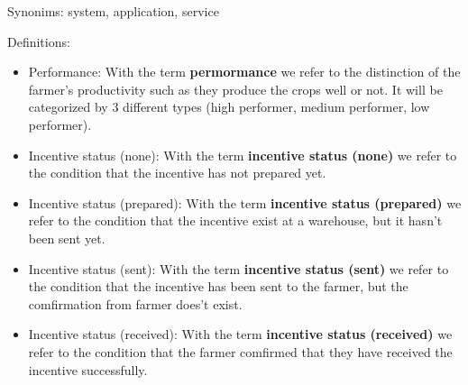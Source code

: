 Synonims: system, application, service

Definitions:
\begin{itemize}
    \item Performance: With the term \textbf{permormance} we refer to the distinction of the farmer's productivity such as they produce the crops well or not. It will be categorized by 3 different types (high performer, medium performer, low performer).
    \item Incentive status (none): With the term \textbf{incentive status (none)} we refer to the condition that the incentive has not prepared yet.
    \item Incentive status (prepared): With the term \textbf{incentive status (prepared)} we refer to the condition that the incentive exist at a warehouse, but it hasn't been sent yet.
    \item Incentive status (sent): With the term \textbf{incentive status (sent)} we refer to the condition that the incentive has been sent to the farmer, but the comfirmation from farmer does't exist.
    \item Incentive status (received): With the term \textbf{incentive status (received)} we refer to the condition that the farmer comfirmed that they have received the incentive successfully.

\end{itemize}

